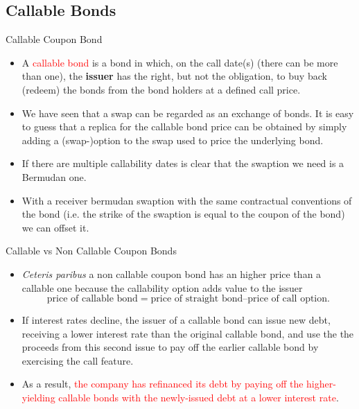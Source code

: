 \documentclass{beamer}
\begin{document}
\subsection{Callable Bonds}
\begin{frame}{Callable Coupon Bond}
\begin{itemize}
	\item<1-> A \textcolor{red}{callable bond} is a bond in which, on the call date(s) (there can be more than one), the \textbf{issuer} has the right, but not the obligation, to buy back (redeem) the bonds from the bond holders at a defined call price.
	\item<2-> We have seen that a swap can be regarded as an exchange of bonds. It is easy to guess that a replica for the callable bond price can be obtained by simply adding a (swap-)option to the swap used to price the underlying bond.
	\item<3-> If there are multiple callability dates is clear that the swaption we need is a Bermudan one.
	\item<4-> With a receiver bermudan swaption with the same contractual conventions of the bond (i.e. the strike of the swaption is equal to the coupon of the bond) we can offset it. %
\end{itemize}
\end{frame}

\begin{frame}{Callable vs Non Callable Coupon Bonds}
\begin{itemize}
	\item<1-> \emph{Ceteris paribus} a non callable coupon bond has an higher price than a callable one because the callability option adds value to the issuer
	\begin{equation*}
		\text{price of callable bond} = \text{price of straight bond} – \text{price of call option}.
	\end{equation*}
	\item<2-> If interest rates decline, the issuer of a callable bond can issue new debt, receiving a lower interest rate than the original callable bond, and use the the proceeds from this second issue to pay off the earlier callable bond by exercising the call feature.
	\item<3-> As a result, \textcolor{red}{the company has refinanced its debt by paying off the higher-yielding callable bonds with the newly-issued debt at a lower interest rate}.		
\end{itemize}
\end{frame}
\end{document}
